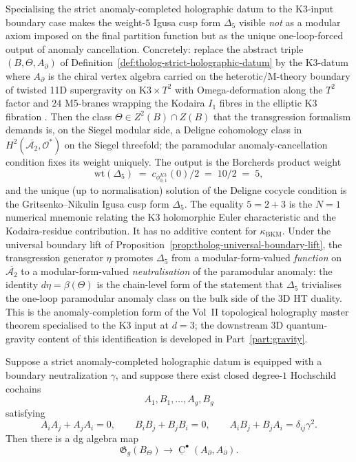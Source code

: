 \begin{remark}
\label{rem:anomtop-delta5-paramodular-output}
Specialising the strict anomaly-completed holographic datum
to the K3-input boundary case makes the weight-$5$ Igusa cusp
form $\Delta_{5}$ visible \emph{not} as a modular axiom imposed
on the final partition function but as the unique one-loop-forced
output of anomaly cancellation.
Concretely: replace the abstract triple $(B,\Theta,A_{\partial})$
of Definition~\ref{def:tholog-strict-holographic-datum} by the
K3-datum where $A_{\partial}$ is the chiral vertex algebra
carried on the heterotic/M-theory boundary of twisted 11D
supergravity on $\mathrm{K3}\times T^{2}$ with Omega-deformation
along the $T^{2}$ factor and $24$ M5-branes wrapping the Kodaira
$I_{1}$ fibres in the elliptic K3 fibration
\cite{costello-gaiotto}.
Then the class $\Theta\in Z^{2}(B)\cap Z(B)$ that the
transgression formalism demands is, on the Siegel modular side,
a Deligne cohomology class in
$H^{2}(\overline{\mathcal A_{2}},\mathcal O^{*})$ on the Siegel
threefold; the paramodular anomaly-cancellation condition fixes
its weight uniquely.
The output is the Borcherds product weight
\[
\mathrm{wt}(\Delta_{5})
\;=\;
c_{\phi_{0,1}^{K3}}(0)/2
\;=\;
10/2
\;=\;
5,
\]
and the unique (up to normalisation) solution of the Deligne
cocycle condition is the Gritsenko--Nikulin Igusa cusp form
$\Delta_{5}$. The equality $5=2+3$ is the $N=1$ numerical
mnemonic relating the K3 holomorphic Euler characteristic and the
Kodaira-residue contribution. It has no additive content for
$\kappa_{\mathrm{BKM}}$.
Under the universal boundary lift of
Proposition~\ref{prop:tholog-universal-boundary-lift}, the
transgression generator $\eta$ promotes $\Delta_{5}$ from a
modular-form-valued \emph{function} on $\overline{\mathcal A_{2}}$
to a modular-form-valued \emph{neutralisation} of the
paramodular anomaly: the identity $d\eta=\beta(\Theta)$ is the
chain-level form of the statement that $\Delta_{5}$ trivialises
the one-loop paramodular anomaly class on the bulk side of the
3D HT duality.
This is the anomaly-completion form of the Vol~II topological
holography master theorem specialised to the K3 input at $d=3$;
the downstream
3D quantum-gravity content of this identification is developed
in Part~\ref{part:gravity}.
\end{remark}

\begin{corollary}
Suppose a strict anomaly-completed holographic datum is equipped with a boundary neutralization \(\gamma\), and suppose there exist closed degree-\(1\) Hochschild cochains
\[
A_{1},B_{1},\dots,A_{g},B_{g}
\]
satisfying
\[
A_{i}A_{j}+A_{j}A_{i}=0,\qquad
B_{i}B_{j}+B_{j}B_{i}=0,\qquad
A_{i}B_{j}+B_{j}A_{i}=\delta_{ij}\gamma^{2}.
\]
Then there is a dg algebra map
\[
\mathfrak{G}_{g}(B_{\Theta})
\longrightarrow
\underline{\operatorname{C}}^{\bullet}(A_{\partial},A_{\partial}).
\]
\end{corollary}

